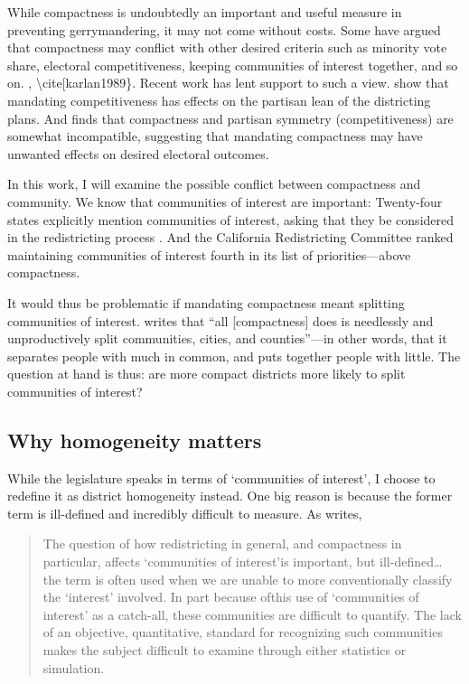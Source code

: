 \documentclass[]{article}
\begin{document}
While compactness is undoubtedly an important and useful measure in
preventing gerrymandering, it may not come without costs. Some have
argued that compactness may conflict with other desired criteria such as
minority vote share, electoral competitiveness, keeping communities of
interest together, and so on. \citep{cain1984},
\textbackslash{}cite{[}karlan1989\}. Recent work has lent support to
such a view. \cite{ddj2019comp} show that mandating competitiveness has
effects on the partisan lean of the districting plans. And \cite{s2020}
finds that compactness and partisan symmetry (competitiveness) are
somewhat incompatible, suggesting that mandating compactness may have
unwanted effects on desired electoral outcomes.

In this work, I will examine the possible conflict between compactness
and community. We know that communities of interest are important:
Twenty-four states explicitly mention communities of interest, asking
that they be considered in the redistricting process \cite{brennan}. And
the California Redistricting Committee ranked maintaining communities of
interest fourth in its list of priorities---above compactness.

It would thus be problematic if mandating compactness meant splitting
communities of interest. \citeauthor{wolf2015} writes that ``all
{[}compactness{]} does is needlessly and unproductively split
communities, cities, and counties''---in other words, that it separates
people with much in common, and puts together people with little. The
question at hand is thus: are more compact districts more likely to
split communities of interest?

\hypertarget{why-homogeneity-matters}{%
\subsection{Why homogeneity matters}\label{why-homogeneity-matters}}

While the legislature speaks in terms of `communities of interest', I
choose to redefine it as district homogeneity instead. One big reason is
because the former term is ill-defined and incredibly difficult to
measure. As \citeauthor{altman1998} writes,

\begin{quote}
The question of how redistricting in general, and compactness in
particular, affects `communities of interest'is important, but
ill-defined\ldots{} the term is often used when we are unable to more
conventionally classify the `interest' involved. In part because ofthis
use of `communities of interest' as a catch-all, these communities are
difficult to quantify. The lack of an objective, quantitative, standard
for recognizing such communities makes the subject difficult to examine
through either statistics or simulation.
\end{quote}
\end{document}
